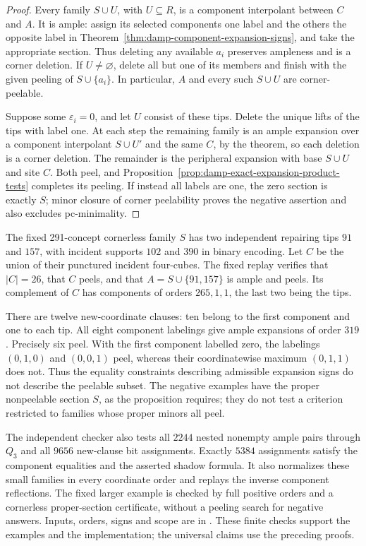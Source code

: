 \begin{proof}
Every family $S\cup U$, with $U\subseteq R$, is a component interpolant
between $C$ and $A$.  It is ample: assign its selected components one
label and the others the opposite label in
Theorem~\ref{thm:damp-component-expansion-signs}, and take the appropriate
section.  Thus deleting any available $a_i$ preserves ampleness and is a
corner deletion.  If $U\ne\varnothing$, delete all but one of its members
and finish with the given peeling of $S\cup\{a_i\}$.  In particular,
$A$ and every such $S\cup U$ are corner-peelable.

Suppose some $\varepsilon_i=0$, and let $U$ consist of these tips.
Delete the unique lifts of the tips with label one.  At each step the
remaining family is an ample expansion over a component interpolant
$S\cup U'$ and the same $C$, by the theorem, so each deletion is a
corner deletion.  The remainder is the peripheral expansion with base
$S\cup U$ and site $C$.  Both peel, and
Proposition~\ref{prop:damp-exact-expansion-product-tests} completes its
peeling.  If instead all labels are one, the zero section is exactly
$S$; minor closure of corner peelability proves the negative assertion
and also excludes pc-minimality.
\end{proof}

\begin{remark}
\label{ex:damp-component-signs-nonlinear-peeling}
The fixed 291-concept cornerless family $S$ has two independent repairing
tips $91$ and $157$, with incident supports $102$ and $390$ in binary
encoding.  Let $C$ be the union of their punctured incident four-cubes.
The fixed replay verifies that $|C|=26$, that $C$ peels, and that
$A=S\cup\{91,157\}$ is ample and peels.  Its complement of $C$ has
components of orders $265,1,1$, the last two being the tips.

There are twelve new-coordinate clauses: ten belong to the first component
and one to each tip.  All eight component labelings give ample expansions
of order $319$.  Precisely six peel.  With the first component labelled
zero, the labelings $(0,1,0)$ and $(0,0,1)$ peel, whereas their
coordinatewise maximum $(0,1,1)$ does not.  Thus the equality constraints
describing admissible expansion signs do not describe the peelable subset.
The negative examples have the proper nonpeelable section $S$, as the
proposition requires; they do not test a criterion restricted to families
whose proper minors all peel.

The independent checker  also
tests all $2244$ nested nonempty ample pairs through $Q_3$ and all $9656$
new-clause bit assignments.  Exactly $5384$ assignments satisfy the
component equalities and the asserted shadow formula.  It also normalizes
these small families in every coordinate order and replays the inverse
component reflections.  The fixed larger
example is checked by full positive orders and a cornerless proper-section
certificate, without a peeling search for negative answers.  Inputs,
orders, signs and scope are in
.  These finite checks
support the examples and the implementation; the universal claims use
the preceding proofs.
\end{remark}

